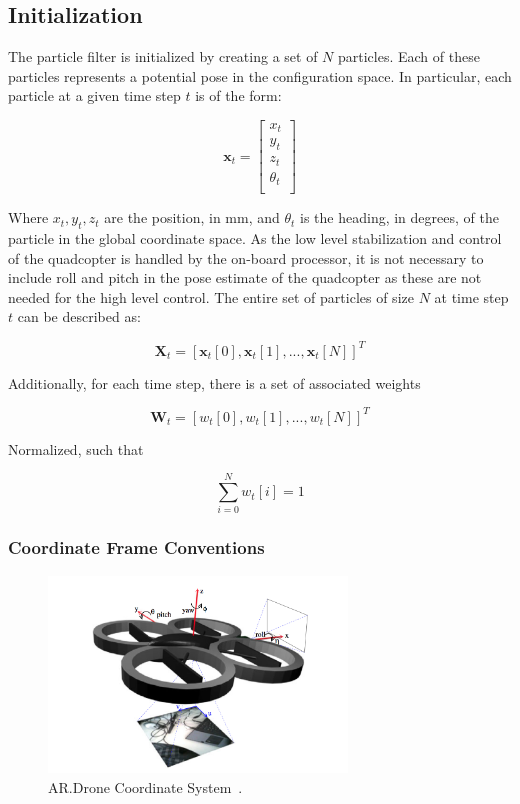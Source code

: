 	\subsection{Initialization}

		The particle filter is initialized by creating a set of $N$ particles. Each of these particles represents a potential pose in the configuration space. In particular, each particle at a given time step $t$ is of the form:

		\[\textbf{x}_t = \begin{bmatrix} 
			  x_t\\
			  y_t\\
			  z_t\\
			  \theta_t\\
			\end{bmatrix}	
		\]

		Where $x_t, y_t, z_t$ are the position, in mm, and $\theta_t$ is the heading, in degrees, of the particle in the global coordinate space. As the low level stabilization and control of the quadcopter is handled by the on-board processor, it is not necessary to include roll and pitch in the pose estimate of the quadcopter as these are not needed for the high level control. The entire set of particles of size $N$ at time step $t$ can be described as:

		\[
		\textbf{X}_t = [\textbf{x}_t[0], \textbf{x}_t[1],...,\textbf{x}_t[N]]^T
		\]

		Additionally, for each time step, there is a set of associated weights

		\[
		\textbf{W}_t = [w_t[0], w_t[1],...,w_t[N]]^T
		\]

		Normalized, such that

		\[
		\sum_{i=0}^N w_t[i] = 1
		\]


		\subsubsection{Coordinate Frame Conventions}

			\begin{figure}
			\centering
				\includegraphics[width=300px]{../images/coordinates.png}
				\caption{AR.Drone Coordinate System~\cite{ARDroneEducation}.}
			\end{figure}

